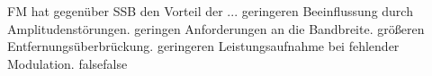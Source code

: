     {FM hat gegenüber SSB den Vorteil der ...}
    {geringeren Beeinflussung durch Amplitudenstörungen.}
    {geringen Anforderungen an die Bandbreite.}
    {größeren Entfernungsüberbrückung.}
    {geringeren Leistungsaufnahme bei fehlender Modulation.}
    {false}{false}